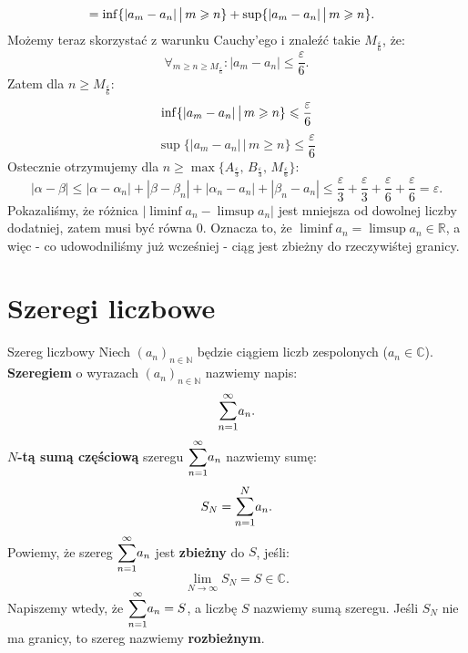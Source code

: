 \documentclass{article}
\numberwithin{defi}{section}
\numberwithin{defi}{section}
\newcommand{\R}{\mathbb{R}}
\newcommand{\N}{\mathbb{N}}
\newcommand{\C}{\mathbb{C}}
\newcommand{\oo}{\infty}
\renewcommand{\inf}{\mathop{\mathrm{inf}\vphantom{\mathrm{sup}}}}
\providecommand{\eps}{\varepsilon}
\newcommand{\bsum}[2]{\mathlarger{\sum_{#1}^{#2}}}
\newcommand{\szerI}[1]{\bsum{n=1}{\oo} #1_n}
\newcommand{\ciag}[1]{(#1_{n})_{n \in \N}}
\newcommand{\gras}[2]{\lim_{#1 \to \oo} #2_{#1}}
\begin{document}
\begin{dow}
\begin{equation}
\begin{split}
            & = \inf\{ |a_m - a_n| \, \big| \, m \geqslant n \} + \sup\{ |a_m - a_n| \, \big| \, m \geqslant n \}.
        \end{split} \end{equation}
    Możemy teraz skorzystać z warunku Cauchy'ego i znaleźć takie $M_{\frac{\eps}{6}}$, że: \begin{equation}
        \forall_{m \geqslant n \geqslant M_{\frac{\eps}{6}}}: |a_m - a_n| \leqslant \frac{\eps}{6}.
    \end{equation} Zatem dla $n \geqslant M_{\frac{\eps}{6}}$:\begin{equation}
        \inf\{ |a_m - a_n| \, \big| \, m \geqslant n \} \leqslant \frac{\eps}{6}
    \end{equation} \begin{equation}
        \sup\{ |a_m - a_n| \, \big| \, m \geqslant n \} \leqslant \frac{\eps}{6}
    \end{equation}
    Ostecznie otrzymujemy dla $n \geqslant \max \{A_{\frac{\eps}{3}}, \, B_{\frac{\eps}{3}}, \, M_{\frac{\eps}{6}}\}$: \begin{equation}
        |\alpha - \beta| \leqslant |\alpha - \alpha_n| + |\beta - \beta_n| +  |\alpha_n - a_n| + |\beta_n - a_n| \leqslant \frac{\eps}{3} + \frac{\eps}{3} + \frac{\eps}{6} + \frac{\eps}{6} = \eps.
    \end{equation}
    Pokazaliśmy, że różnica $|\liminf a_n - \limsup a_n|$ jest mniejsza od dowolnej liczby dodatniej, zatem musi być równa $0$. Oznacza to, że $\liminf a_n = \limsup a_n \in \R$, a więc - co udowodniliśmy już wcześniej - ciąg jest zbieżny do rzeczywiśtej granicy.
\end{dow}



\newpage
\section{Szeregi liczbowe}
\begin{defr}{Szereg liczbowy}
    Niech $\ciag{a}$ będzie ciągiem liczb zespolonych ($a_n \in \C$). \textbf{Szeregiem} o wyrazach $\ciag{a}$ nazwiemy napis: \begin{equation}
        \bsum{n=1}{\oo} a_n.
    \end{equation} \textbf{$N$-tą sumą częściową} szeregu $\szerI{a}$ nazwiemy sumę: \begin{equation}
        S_N = \bsum{n=1}{N} a_n.
    \end{equation} Powiemy, że szereg $\szerI{a}$ jest \textbf{zbieżny} do $S$, jeśli: \begin{equation}
        \gras{N}{S} = S \in \C.
    \end{equation} Napiszemy wtedy, że $\szerI{a} = S$, a liczbę $S$ nazwiemy sumą szeregu. Jeśli $S_N$ nie ma granicy, to szereg nazwiemy \textbf{rozbieżnym}.
\end{defr}
\end{document}

